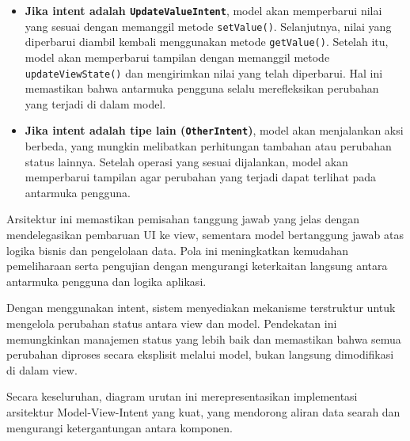 \begin{itemize}
	\item \textbf{Jika intent adalah \texttt{UpdateValueIntent}}, model akan memperbarui nilai yang sesuai dengan memanggil metode \texttt{setValue()}. Selanjutnya, nilai yang diperbarui diambil kembali menggunakan metode \texttt{getValue()}. Setelah itu, model akan memperbarui tampilan dengan memanggil metode \texttt{updateViewState()} dan mengirimkan nilai yang telah diperbarui. Hal ini memastikan bahwa antarmuka pengguna selalu merefleksikan perubahan yang terjadi di dalam model.
	\item \textbf{Jika intent adalah tipe lain (\texttt{OtherIntent})}, model akan menjalankan aksi berbeda, yang mungkin melibatkan perhitungan tambahan atau perubahan status lainnya. Setelah operasi yang sesuai dijalankan, model akan memperbarui tampilan agar perubahan yang terjadi dapat terlihat pada antarmuka pengguna.
\end{itemize}

Arsitektur ini memastikan pemisahan tanggung jawab yang jelas dengan mendelegasikan pembaruan UI ke view, sementara model bertanggung jawab atas logika bisnis dan pengelolaan data. Pola ini meningkatkan kemudahan pemeliharaan serta pengujian dengan mengurangi keterkaitan langsung antara antarmuka pengguna dan logika aplikasi.

Dengan menggunakan intent, sistem menyediakan mekanisme terstruktur untuk mengelola perubahan status antara view dan model. Pendekatan ini memungkinkan manajemen status yang lebih baik dan memastikan bahwa semua perubahan diproses secara eksplisit melalui model, bukan langsung dimodifikasi di dalam view.

Secara keseluruhan, diagram urutan ini merepresentasikan implementasi arsitektur Model-View-Intent yang kuat, yang mendorong aliran data searah dan mengurangi ketergantungan antara komponen.
